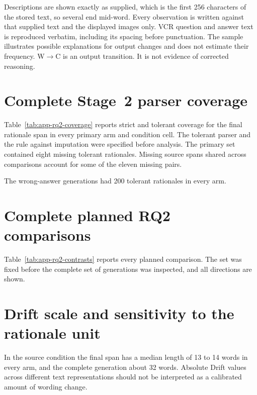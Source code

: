 Descriptions are shown exactly as supplied, which is the first 256 characters of
the stored text, so several end mid-word. Every observation is written against
that supplied text and the displayed images only. VCR question and answer text is
reproduced verbatim, including its spacing before punctuation. The sample
illustrates possible explanations for output changes and does not estimate their
frequency. W$\rightarrow$C is an output transition. It is not evidence of
corrected reasoning.



\clearpage

\section{Complete Stage~2 parser coverage}
\label{sec:app-rq2-coverage}

Table~\ref{tab:app-rq2-coverage} reports strict and tolerant coverage for the
final rationale span in every primary arm and condition cell. The tolerant
parser and the rule against imputation were specified before analysis. The
primary set contained eight missing tolerant rationales. Missing source
spans shared across comparisons account for some of the eleven missing pairs.



The wrong-answer generations had 200 tolerant rationales in every arm.

\section{Complete planned RQ2 comparisons}
\label{sec:app-rq2-contrasts}

Table~\ref{tab:app-rq2-contrasts} reports every planned comparison. The set was
fixed before the complete set of generations was inspected, and all directions
are shown.



\section{Drift scale and sensitivity to the rationale unit}
\label{sec:app-rq2-sensitivity}

In the source condition the final span has a median length of 13 to 14 words in
every arm, and the complete generation about 32 words. Absolute Drift values
across different text representations should not be interpreted as a calibrated
amount of wording change.

